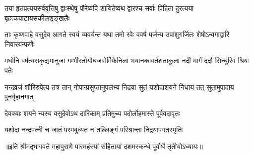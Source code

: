 \fourlineindentedshloka
{तया हृतप्रत्ययसर्ववृत्तिषु}
{द्वाःस्थेषु पौरेष्वपि शायितेष्वथ}
{द्वारश्च सर्वाः पिहिता दुरत्यया}
{बृहत्कपाटायसकीलशृङ्खलैः} %

\fourlineindentedshloka
{ताः कृष्णवाहे वसुदेव आगते}
{स्वयं व्यवर्यन्त यथा तमो रवेः}
{ववर्ष पर्जन्य उपांशुगर्जितः}
{शेषोऽन्वगाद्वारि निवारयन्फणैः} %

\fourlineindentedshloka
{मघोनि वर्षत्यसकृद्यमानुजा}
{गम्भीरतोयौघजवोर्मिफेनिला}
{भयानकावर्तशताकुला नदी}
{मार्गं ददौ सिन्धुरिव श्रियः पतेः} %

\fourlineindentedshloka
{नन्दव्रजं शौरिरुपेत्य तत्र तान्}
{गोपान्प्रसुप्तानुपलभ्य निद्रया}
{सुतं यशोदाशयने निधाय तत्}
{सुतामुपादाय पुनर्गृहानगात्} %

\twolineshloka
{देवक्याः शयने न्यस्य वसुदेवोऽथ दारिकाम्}
{प्रतिमुच्य पदोर्लोहमास्ते पूर्ववदावृतः} %

\twolineshloka
{यशोदा नन्दपत्नी च जातं परमबुध्यत}
{न तल्लिङ्गं परिश्रान्ता निद्रयापगतस्मृतिः}


॥इति श्रीमद्भागवते महापुराणे पारमहंस्यां संहितायां दशमस्कन्धे पूर्वार्धे तृतीयोऽध्यायः॥

